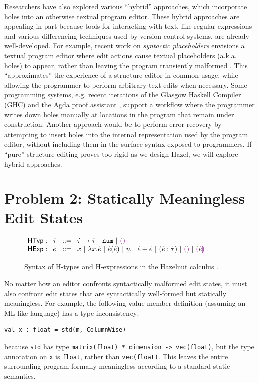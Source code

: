 \documentclass[letterpaper,USenglish]{lipics-v2016}
\newcommand{\llparenthesiscolor}{\textcolor{violet}{\llparenthesis}}
\newcommand{\rrparenthesiscolor}{\textcolor{violet}{\rrparenthesis}}
\newcommand{\htau}{\dot{\tau}}
\newcommand{\tarr}[2]{#1 \rightarrow #2}
\newcommand{\tnum}{\texttt{num}}
\newcommand{\tehole}{\llparenthesiscolor\rrparenthesiscolor}
\newcommand{\hexp}{\dot{e}}
\newcommand{\hlam}[2]{\lambda #1.#2}
\newcommand{\hap}[2]{#1(#2)}
\newcommand{\hnum}[1]{\underline{#1}}
\newcommand{\hadd}[2]{#1 + #2}
\newcommand{\hehole}{\llparenthesiscolor\rrparenthesiscolor}
\newcommand{\hhole}[1]{\llparenthesiscolor#1\rrparenthesiscolor}
\let\li\lstinline
\newcommand{\Hazel}[0]{\textsf{Hazel}}
\begin{document}
Researchers have also explored various ``hybrid'' approaches, which incorporate holes into an otherwise textual program editor. These hybrid approaches are appealing in part because tools for interacting with text, like regular expressions and various differencing techniques used by version control systems, are already well-developed. For example, recent work on \emph{syntactic placeholders} envisions 
a textual program editor where edit actions cause textual placeholders (a.k.a. holes) to appear, rather than leaving the program transiently malformed \cite{Amorim:2016:PSC:2997364.2997374}. This 
``approximates'' the experience of a structure editor in common usage, while allowing the programmer to perform arbitrary 
text edits when necessary. Some programming systems, e.g. recent iterations of the Glasgow Haskell Compiler (GHC) \cite{GCHWIKI} and the Agda proof assistant \cite{norell2009dependently}, support a workflow where the programmer writes down holes manually at locations in the program that remain under construction. Another approach would be to perform error recovery by attempting to insert holes into the internal representation used 
by the program editor, without including them in the surface syntax exposed to programmers.  If ``pure'' structure editing proves too rigid as we design \Hazel, we will explore hybrid approaches.

\section{Problem 2: Statically Meaningless Edit States} \label{sec:p-statics}

\begin{figure}[t]
$\arraycolsep=4pt\begin{array}{lllllll}
\mathsf{HTyp:} & \htau & ::= &
  \tarr{\htau}{\htau} ~\vert~
  \tnum ~\vert~
  \tehole
\\
\mathsf{HExp:} & \hexp & ::= &
  x ~\vert~
  \hlam{x}{\hexp} ~\vert~
  \hap{\hexp}{\hexp} ~\vert~
  \hnum{n} ~\vert~
  \hadd{\hexp}{\hexp} ~\vert~
  (\hexp : \htau) ~\vert~
  \hehole ~\vert~
  \hhole{\hexp}
\end{array}$
\caption{Syntax of H-types and H-expressions in the Hazelnut calculus \cite{popl-paper}.}
\label{fig:hexp-syntax}
\end{figure}

No matter how an 
editor confronts syntactically malformed edit states, it must also confront 
edit states that are syntactically well-formed but statically meaningless. For
example, the following value member definition (assuming an ML-like language) has a type inconsistency:
\begin{lstlisting}[numbers=none]
val x : float = std(m, ColumnWise)
\end{lstlisting}
because \li{std} has type \li{matrix(float) * dimension -> vec(float)},
but the type annotation on \li{x} is \li{float}, rather than \li{vec(float)}. This leaves the entire surrounding program
formally meaningless according to a standard static semantics.
\end{document}

